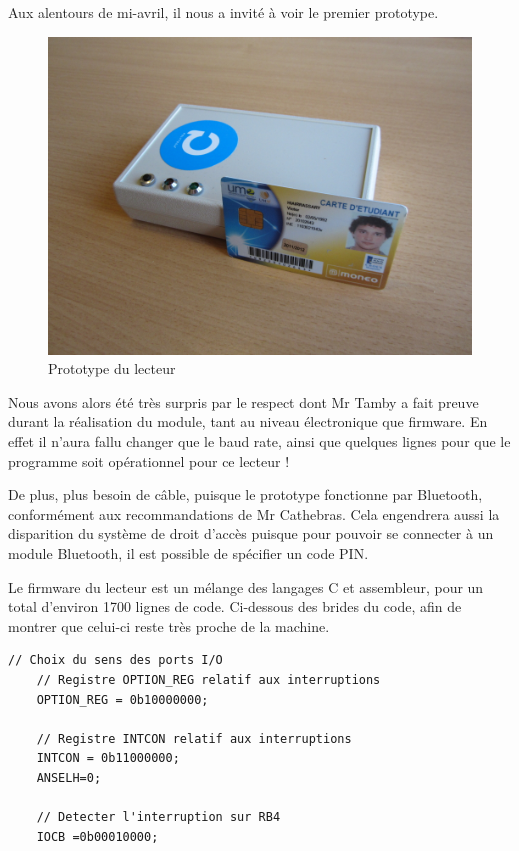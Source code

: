 Aux alentours de mi-avril, il nous a invité à voir le premier prototype.

    \begin{figure}[h]
        \begin{center}
            \includegraphics[scale=0.75]{images/proto.jpg} 
        \end{center}
        \caption{Prototype du lecteur}
        \label{Prototype du lecteur}
     \end{figure} 

Nous avons alors été très surpris par le respect dont Mr Tamby a fait preuve
durant la réalisation du module, tant au niveau électronique que firmware.
En effet il n'aura fallu changer que le baud rate, ainsi que quelques lignes
pour que le programme soit opérationnel pour ce lecteur !

De plus, plus besoin de câble, puisque le prototype fonctionne par Bluetooth,
conformément aux recommandations de Mr Cathebras. Cela engendrera aussi la disparition
du système de droit d'accès puisque pour pouvoir se connecter à un module Bluetooth,
il est possible de spécifier un code PIN.

Le firmware du lecteur est un mélange des langages C et assembleur, pour un total
d'environ 1700 lignes de code. Ci-dessous des brides du code, afin de montrer
que celui-ci reste très proche de la machine.

    \lstset{language=C}
    \begin{lstlisting} 
// Choix du sens des ports I/O
    // Registre OPTION_REG relatif aux interruptions
    OPTION_REG = 0b10000000;

    // Registre INTCON relatif aux interruptions
    INTCON = 0b11000000;
    ANSELH=0;

    // Detecter l'interruption sur RB4
    IOCB =0b00010000;
    \end{lstlisting}


